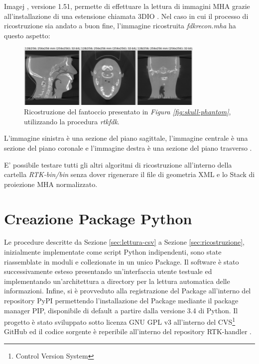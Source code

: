 \documentclass[a4paper,12pt, doubleside]{report}
\begin{document}
            \bigskip    
            \par
                Imagej \cite{imagej}, versione 1.51, permette di effettuare la lettura di immagini MHA grazie all'installazione di una estensione chiamata 3DIO \cite{imagej-3dio-plugin}. Nel caso in cui il processo di ricostruzione sia andato a buon fine, l'immagine ricostruita \textit{fdk\textunderscore recon.mha} ha questo aspetto:
                    
                \begin{figure}[h]        
                    \centering
                    \includegraphics[width=0.8\textwidth]{reconstruction}
                    \caption{Ricostruzione del fantoccio presentato in \textit{Figura \ref{fig:skull-phantom}}, utilizzando la procedura \textit{rtkfdk}.}
                    \label{fig:reconstruction}
                \end{figure}
                
                L'immagine sinistra è una sezione del piano sagittale, l'immagine centrale è una sezione del piano coronale e l'immagine destra è una sezione del piano trasverso \cite{planes}.
                
            \bigskip
            \par
                E' possibile testare tutti gli altri algoritmi di ricostruzione all'interno della cartella \textit{RTK-bin/bin} senza dover rigenerare il file di geometria XML e lo Stack di proiezione MHA normalizzato. 
            
            
    \chapter{Creazione Package Python}
        \par
            Le procedure descritte da Sezione \ref{sec:lettura-csv} a Sezione \ref{sec:ricostruzione}, inizialmente implementate come script Python indipendenti, sono state riassemblate in moduli e collezionate in un unico Package. Il software è stato successivamente esteso presentando un'interfaccia utente testuale ed implementando un'architettura a directory per la lettura automatica delle informazioni. Infine, si è provveduto alla registrazione del Package all'interno del repository PyPI permettendo l'installazione del Package mediante il package manager PIP, disponibile di default a partire dalla versione 3.4 di Python. Il progetto è stato sviluppato sotto licenza GNU GPL v3 \cite{gpl-v3} all'interno del CVS\footnote{Control Version System} GitHub ed il codice sorgente è reperibile all'interno del repository RTK-handler \cite{rtk-handler-source}. 
            
\end{document}
